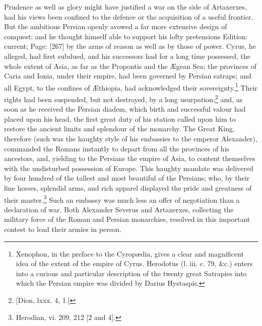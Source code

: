 Prudence as well as glory might have justified a war on the side of Artaxerxes, had his views been confined to the defence or the acquisition of a useful frontier. But the ambitious Persian openly avowed a far more extensive design of conquest; and he thought himself able to support his lofty pretensions Edition: current; Page: [267] by the arms of reason as well as by those of power. Cyrus, he alleged, had first subdued, and his successors had for a long time possessed, the whole extent of Asia, as far as the Propontis and the Ægean Sea; the provinces of Caria and Ionia, under their empire, had been governed by Persian satraps; and all Egypt, to the confines of Æthiopia, had acknowledged their sovereignty.\footnote{Xenophon, in the preface to the Cyropædia, gives a clear and magnificent idea of the extent of the empire of Cyrus. Herodotus (l. iii. c. 79, \&c.) enters into a curious and particular description of the twenty great Satrapies into which the Persian empire was divided by Darius Hystaspis.} Their rights had been suspended, but not destroyed, by a long usurpation;\footnote{[Dion, lxxx. 4, 1.]} and, as soon as he received the Persian diadem, which birth and successful valour had placed upon his head, the first great duty of his station called upon him to restore the ancient limits and splendour of the monarchy. The Great King, therefore (such was the haughty style of his embassies to the emperor Alexander), commanded the Romans instantly to depart from all the provinces of his ancestors, and, yielding to the Persians the empire of Asia, to content themselves with the undisturbed possession of Europe. This haughty mandate was delivered by four hundred of the tallest and most beautiful of the Persians; who, by their fine horses, splendid arms, and rich apparel displayed the pride and greatness of their master.\footnote{Herodian, vi. 209, 212 [2 and 4].} Such an embassy was much less an offer of negotiation than a declaration of war. Both Alexander Severus and Artaxerxes, collecting the military force of the Roman and Persian monarchies, resolved in this important contest to lead their armies in person.


